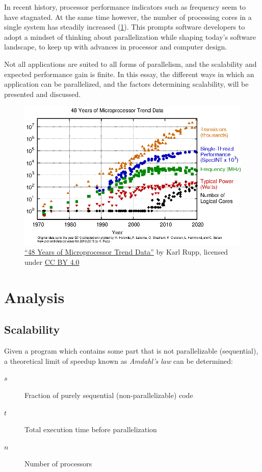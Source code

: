\documentclass[BCOR20mm,DIV14,10pt,headinclude,footexclude,bibtotoc,liststotoc]{article}
\begin{document}
In recent history, processor performance indicators such as frequency seem to
have stagnated. At the same time however, the number of processing cores in a
single system has steadily increased (\cref{fig:processor_trend}). This prompts
software developers to adopt a mindset of thinking about parallelization while
shaping today's software landscape, to keep up with advances in processor and
computer design.

Not all applications are suited to all forms of parallelism, and the scalability
and expected performance gain is finite. In this essay, the different ways in
which an application can be parallelized, and the factors determining
scalability, will be presented and discussed.

\begin{figure}[h]
	\centering
	\includegraphics{images/48-years-processor-trend}
	\caption[48 Years of Microprocessor Trend Data]{
		\href{https://github.com/karlrupp/microprocessor-trend-data}
		{``48 Years of Microprocessor Trend Data''} by Karl Rupp, licensed under
		\href{https://creativecommons.org/licenses/by/4.0/}{CC BY 4.0}}
	\label{fig:processor_trend}
\end{figure}

\section{Analysis}

\subsection{Scalability}

Given a program which contains some part that is not parallelizable
(sequential), a theoretical limit of speedup known as \emph{Amdahl's law}
can be determined:
\begin{description}
	\item[$s$] Fraction of purely sequential (non-parallelizable) code
	\item[$t$] Total execution time before parallelization
	\item[$n$] Number of processors
\end{description}
\end{document}
